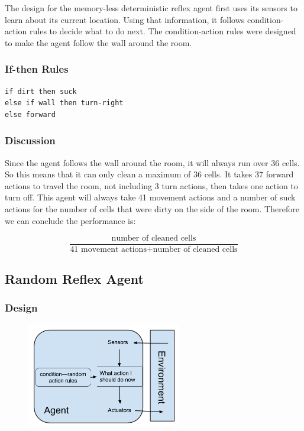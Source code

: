 \documentclass[a4paper,10pt]{article}
\begin{document}
The design for the memory-less deterministic reflex agent first uses its sensors to learn about its current location. Using that information, it follows condition-action rules to decide what to do next. The condition-action rules were designed to make the agent follow the wall around the room.

\subsubsection{If-then Rules}
\begin{verbatim}
if dirt then suck
else if wall then turn-right
else forward
\end{verbatim}

\subsubsection{Discussion}

Since the agent follows the wall around the room, it will always run over 36 cells.
So this means that it can only clean a maximum of 36 cells.
It takes 37 forward actions to travel the room, not including 3 turn actions, then takes one action to turn off.
This agent will always take 41 movement actions and a number of suck actions for the number of cells that were dirty on the side of the room.
Therefore we can conclude the performance is:

\[\frac{\mbox{number of cleaned cells}}{\mbox{41 movement actions} + \mbox{number of cleaned cells}}\]




\subsection{Random Reflex Agent}
\subsubsection{Design}
\begin{figure}[H]
	\begin{center}
		\includegraphics[width=0.6\textwidth]{RandomReflex.png}
	\end{center}
\end{figure}
\end{document}
